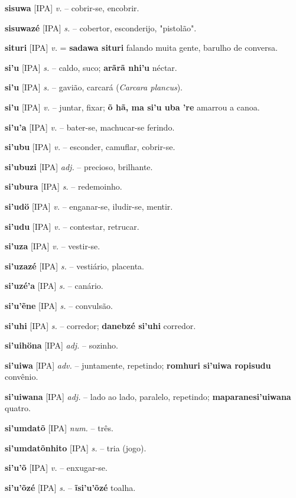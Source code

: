 \textbf{sisuwa} [IPA] \textit{v.} -- cobrir-se, encobrir.

\textbf{sisuwazé} [IPA] \textit{s.} -- cobertor, esconderijo, "pistolão".

\textbf{situri} [IPA] \textit{v.} = \textbf{sadawa situri} falando muita gente, barulho de conversa.

\textbf{si'u} [IPA] \textit{s.} -- caldo, suco; \textbf{arãrã nhi'u} néctar.

\textbf{si'u} [IPA] \textit{s.} -- gavião, carcará (\textit{Carcara plancus}).

\textbf{si'u} [IPA] \textit{v.} -- juntar, fixar; \textbf{õ hã, ma si'u uba 're} amarrou a canoa.

\textbf{si'u'a} [IPA] \textit{v.} -- bater-se, machucar-se ferindo.

\textbf{si'ubu} [IPA] \textit{v.} -- esconder, camuflar, cobrir-se.

\textbf{si'ubuzi} [IPA] \textit{adj.} -- precioso, brilhante.

\textbf{si'ubura} [IPA] \textit{s.} -- redemoinho.

\textbf{si'udö} [IPA] \textit{v.} -- enganar-se, iludir-se, mentir.

\textbf{si'udu} [IPA] \textit{v.} -- contestar, retrucar.

\textbf{si'uza} [IPA] \textit{v.} -- vestir-se.

\textbf{si'uzazé} [IPA] \textit{s.} -- vestiário, placenta.

\textbf{si'uzé'a} [IPA] \textit{s.} -- canário.

\textbf{si'u'ẽne} [IPA] \textit{s.} -- convulsão.

\textbf{si'uhi} [IPA] \textit{s.} -- corredor; \textbf{danebzé si'uhi} corredor.

\textbf{si'uihöna} [IPA] \textit{adj.} -- sozinho.

\textbf{si'uiwa} [IPA] \textit{adv.} -- juntamente, repetindo; \textbf{romhuri si'uiwa ropisudu} convênio.

\textbf{si'uiwana} [IPA] \textit{adj.} -- lado ao lado, paralelo, repetindo; \textbf{maparanesi'uiwana} quatro.

\textbf{si'umdatõ} [IPA] \textit{num.} -- três.

\textbf{si'umdatõnhito} [IPA] \textit{s.} -- tria (jogo).

\textbf{si'u'õ} [IPA] \textit{v.} -- enxugar-se.

\textbf{si'u'õzé} [IPA] \textit{s.} -- \textbf{ĩsi'u'õzé} toalha.

